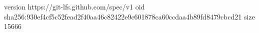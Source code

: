 version https://git-lfs.github.com/spec/v1
oid sha256:930ef4cf5c52fead2f40aa46c82422e9c601878ca60ccdaa4b89fd8479cbcd21
size 15666
